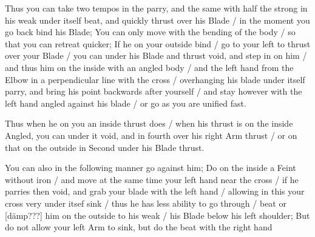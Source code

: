 
Thus you can take two tempos in the parry, and the same with half the
strong in his weak under itself beat, and quickly thrust over his
Blade / in the moment you go back bind his Blade; You can only move with
the bending of the body / so that you can retreat quicker; If he on
your outside bind / go to your left to thrust over your Blade / you
can under his Blade and thrust void, and step in on him / and thus him
on the inside with an angled body / and the left hand from the Elbow
in a perpendicular line with the cross / overhanging his blade under
itself parry, and bring his point backwards after yourself / and stay
however with the left hand angled against his blade / or go as you are
unified fast.


Thus when he on you an inside thrust does / when his thrust is on the
inside Angled, you can under it void, and in fourth over his right Arm
thrust / or on that on the outside in Second under his Blade thrust.


You can also in the following manner go against him; Do on the inside
a Feint without iron / and move at the same time your left hand near
the cross / if he parries then void, and grab your blade with the left
hand / allowing in this your cross very under itsef sink / thus he has
less ability to go through / beat or [dämp???] him on the outside to his weak / his Blade
below his left shoulder; But do not allow your left Arm to sink, but
do the beat with the right hand
